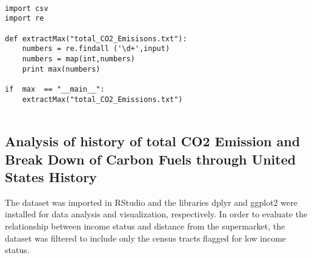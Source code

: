 \documentclass[letterpaper]{article}
\begin{document}
\lstset{language=Python}
\begin{lstlisting}[frame=single]

import csv
import re

def extractMax("total_CO2_Emisisons.txt"): 
	numbers = re.findall ('\d+',input)
	numbers = map(int,numbers) 
	print max(numbers) 
  
if  max  == "__main__": 
    extractMax("total_CO2_Emissions.txt")
    
\end{lstlisting}

\subsection{Analysis of history of total CO2 Emission and Break Down of Carbon Fuels through United States History}

The dataset was imported in RStudio and the libraries dplyr and ggplot2 were installed for data analysis and visualization, respectively. In order to evaluate the relationship between income status and distance from the supermarket, the dataset was filtered to include only the census tracts flagged for low income status. 
\end{document}
